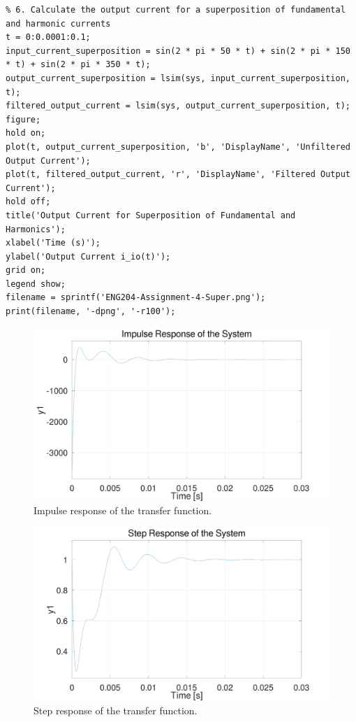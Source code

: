 \documentclass[11pt]{article}
\begin{document}
\begin{verbatim}
% 6. Calculate the output current for a superposition of fundamental and harmonic currents
t = 0:0.0001:0.1;
input_current_superposition = sin(2 * pi * 50 * t) + sin(2 * pi * 150 * t) + sin(2 * pi * 350 * t);
output_current_superposition = lsim(sys, input_current_superposition, t);
filtered_output_current = lsim(sys, output_current_superposition, t);
figure;
hold on;
plot(t, output_current_superposition, 'b', 'DisplayName', 'Unfiltered Output Current');
plot(t, filtered_output_current, 'r', 'DisplayName', 'Filtered Output Current');
hold off;
title('Output Current for Superposition of Fundamental and Harmonics');
xlabel('Time (s)');
ylabel('Output Current i_io(t)');
grid on;
legend show;
filename = sprintf('ENG204-Assignment-4-Super.png');
print(filename, '-dpng', '-r100');
\end{verbatim}
\begin{FIGURE}
\begin{figure}[H]
\centering
\includegraphics[width=.9\linewidth]{ENG204-Assignment-4-Impulse.png}
\caption{Impulse response of the transfer function.}
\end{figure}
\end{FIGURE}
\begin{FIGURE}
\begin{figure}[H]
\centering
\includegraphics[width=.9\linewidth]{ENG204-Assignment-4-Step.png}
\caption{Step response of the transfer function.}
\end{figure}
\end{FIGURE}
\end{document}

